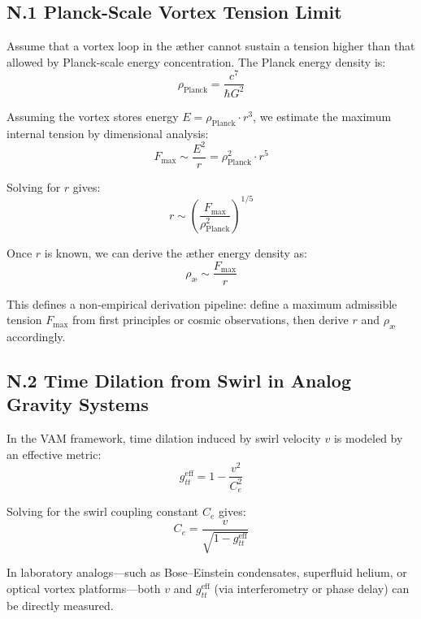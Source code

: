 \subsection*{N.1 Planck-Scale Vortex Tension Limit}

Assume that a vortex loop in the æther cannot sustain a tension higher than that allowed by Planck-scale energy concentration. The Planck energy density is:
\begin{equation}
    \rho_{\text{Planck}} = \frac{c^7}{\hbar G^2}
\end{equation}

Assuming the vortex stores energy $E = \rho_{\text{Planck}} \cdot r^3$, we estimate the maximum internal tension by dimensional analysis:
\begin{equation}
    F_{\max} \sim \frac{E^2}{r} = \rho_{\text{Planck}}^2 \cdot r^5
\end{equation}

Solving for $r$ gives:
\begin{equation}
    r \sim \left( \frac{F_{\max}}{\rho_{\text{Planck}}^2} \right)^{1/5}
\end{equation}

Once $r$ is known, we can derive the æther energy density as:
\begin{equation}
    \rho_{\text{æ}} \sim \frac{F_{\max}}{r}
\end{equation}

This defines a non-empirical derivation pipeline: define a maximum admissible tension $F_{\max}$ from first principles or cosmic observations, then derive $r$ and $\rho_{\text{æ}}$ accordingly.

\subsection*{N.2 Time Dilation from Swirl in Analog Gravity Systems}

In the VAM framework, time dilation induced by swirl velocity $v$ is modeled by an effective metric:
\begin{equation}
    g_{tt}^{\text{eff}} = 1 - \frac{v^2}{C_e^2}
\end{equation}

Solving for the swirl coupling constant $C_e$ gives:
\begin{equation}
    C_e = \frac{v}{\sqrt{1 - g_{tt}^{\text{eff}}}}
\end{equation}

In laboratory analogs—such as Bose–Einstein condensates, superfluid helium, or optical vortex platforms—both $v$ and $g_{tt}^{\text{eff}}$ (via interferometry or phase delay) can be directly measured.

